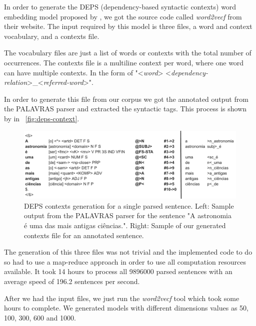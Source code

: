 In order to generate the DEPS (dependency-based syntactic contexts) word embedding model proposed by , we got the source code called \textit{word2vecf} from their website. The input required by this model is three files, a word and context vocabulary, and a contexts file. 

The vocabulary files are just a list of words or contexts with the total number of occurrences. The contexts file is a multiline context per word, where one word can have multiple contexts. In the form of "<\textit{word}> <\textit{dependency-relation}>\_<\textit{referred-word}>".

In order to generate this file from our corpus we got the annotated output from the PALAVRAS parser and extracted the syntactic tags. This process is shown by in ~\autoref{fig:deps-context}.

\begin{figure}[h]
    \caption{DEPS contexts generation for a single parsed sentence. Left: Sample output from the PALAVRAS parser for the sentence "A astronomia é uma das mais antigas ciências.". Right: Sample of our generated contexts file for an annotated sentence.}
    \label{fig:deps-context}
    \centering%
    \begin{minipage}{.95\textwidth}
        \includegraphics[width=\textwidth]{deps-context.png}
    \end{minipage}
\end{figure}

The generation of this three files was not trivial and the implemented code to do so had to use a map-reduce approach in order to use all computation resources available. It took 14 hours to process all 9896000 parsed sentences with an average speed of 196.2 sentences per second.

After we had the input files, we just run the \textit{word2vecf} tool which took some hours to complete. We generated models with different dimensions values as 50, 100, 300, 600 and 1000.